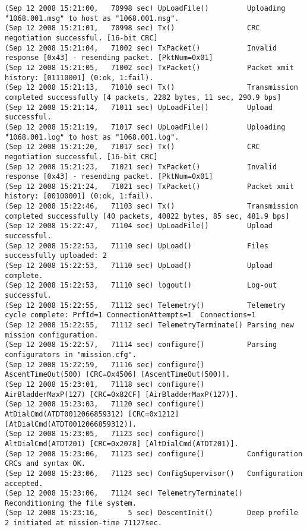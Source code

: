 {\begin{verbatim}
(Sep 12 2008 15:21:00,   70998 sec) UpLoadFile()         Uploading "1068.001.msg" to host as "1068.001.msg".
(Sep 12 2008 15:21:01,   70998 sec) Tx()                 CRC negotiation successful. [16-bit CRC]
(Sep 12 2008 15:21:04,   71002 sec) TxPacket()           Invalid response [0x43] - resending packet. [PktNum=0x01]
(Sep 12 2008 15:21:05,   71002 sec) TxPacket()           Packet xmit history: [01110001] (0:ok, 1:fail).
(Sep 12 2008 15:21:13,   71010 sec) Tx()                 Transmission completed successfully [4 packets, 2282 bytes, 11 sec, 290.9 bps]
(Sep 12 2008 15:21:14,   71011 sec) UpLoadFile()         Upload successful.
(Sep 12 2008 15:21:19,   71017 sec) UpLoadFile()         Uploading "1068.001.log" to host as "1068.001.log".
(Sep 12 2008 15:21:20,   71017 sec) Tx()                 CRC negotiation successful. [16-bit CRC]
(Sep 12 2008 15:21:23,   71021 sec) TxPacket()           Invalid response [0x43] - resending packet. [PktNum=0x01]
(Sep 12 2008 15:21:24,   71021 sec) TxPacket()           Packet xmit history: [00100001] (0:ok, 1:fail).
(Sep 12 2008 15:22:46,   71103 sec) Tx()                 Transmission completed successfully [40 packets, 40822 bytes, 85 sec, 481.9 bps]
(Sep 12 2008 15:22:47,   71104 sec) UpLoadFile()         Upload successful.
(Sep 12 2008 15:22:53,   71110 sec) UpLoad()             Files successfully uploaded: 2
(Sep 12 2008 15:22:53,   71110 sec) UpLoad()             Upload complete.
(Sep 12 2008 15:22:53,   71110 sec) logout()             Log-out successful.
(Sep 12 2008 15:22:55,   71112 sec) Telemetry()          Telemetry cycle complete: PrfId=1 ConnectionAttempts=1  Connections=1
(Sep 12 2008 15:22:55,   71112 sec) TelemetryTerminate() Parsing new mission configuration.
(Sep 12 2008 15:22:57,   71114 sec) configure()          Parsing configurators in "mission.cfg".
(Sep 12 2008 15:22:59,   71116 sec) configure()             AscentTimeOut(500) [CRC=0x4506] [AscentTimeOut(500)].
(Sep 12 2008 15:23:01,   71118 sec) configure()             AirBladderMaxP(127) [CRC=0x82CF] [AirBladderMaxP(127)].
(Sep 12 2008 15:23:03,   71120 sec) configure()             AtDialCmd(ATDT0012066859312) [CRC=0x1212] [AtDialCmd(ATDT0012066859312)].
(Sep 12 2008 15:23:05,   71123 sec) configure()             AltDialCmd(ATDT201) [CRC=0x2078] [AltDialCmd(ATDT201)].
(Sep 12 2008 15:23:06,   71123 sec) configure()          Configuration CRCs and syntax OK.
(Sep 12 2008 15:23:06,   71123 sec) ConfigSupervisor()   Configuration accepted.
(Sep 12 2008 15:23:06,   71124 sec) TelemetryTerminate() Reconditioning the file system.
(Sep 12 2008 15:23:16,       5 sec) DescentInit()        Deep profile 2 initiated at mission-time 71127sec.

\end{verbatim}}
